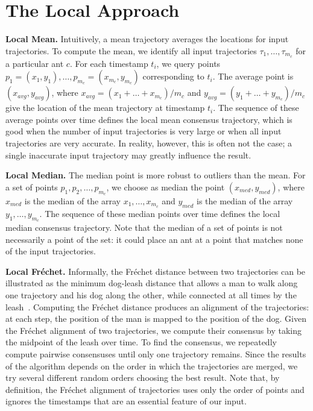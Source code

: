 \documentclass[runningheads]{llncs}
\newcommand{\Frechet}[0]{Fr\'{e}chet}
\begin{document}
\section{The Local Approach}
\label{sect:local}

{\bf Local Mean.}
Intuitively, a mean trajectory averages the locations for
input trajectories. To compute the mean, we identify all input
trajectories $\tau_1, \dots, \tau_{m_c}$ for a particular ant $c$. For
each timestamp $t_i$, we query points
$p_1=(x_1, y_1), \dots, p_{m_c}=(x_{m_c}, y_{m_c})$ corresponding to
$t_i$. The average point is $(x_{avg}, y_{avg})$,
where $x_{avg}=(x_1 + \dots + x_{m_c})/m_c$ and $y_{avg}=(y_1 + \dots
+ y_{m_c})/m_c$ give the location of the mean
trajectory at timestamp $t_i$. The sequence of these average points
over time defines the local mean consensus trajectory, which
 is good when the number of input trajectories is
very large or when all input trajectories are very accurate. In
reality, however, this is often not the case; a single
inaccurate input trajectory may greatly influence the result.

{\bf Local Median.}
The median point is more robust to outliers than the mean.
For a set of points $p_1,p_2, \dots, p_{m_c}$,
we choose as median
the point $(x_{med}, y_{med})$, where $x_{med}$ is the median of the
array $x_1, \dots, x_{m_c}$ and $y_{med}$ is
the median of the array $y_1, \dots, y_{m_c}$. The sequence of these
median points over time defines the local median consensus trajectory.
Note that the median of a set of points is not necessarily a point of
the set: it could place an ant at a point that matches none of the input trajectories.


{\bf Local \Frechet{}.}
Informally, the \Frechet{} distance between two trajectories can be illustrated as the
minimum dog-leash distance that allows a
man to walk along one trajectory and his dog along the other, while connected at all times by the leash~\cite{DBLP:journals/ijcga/AltG95}. Computing
the \Frechet{} distance produces an alignment of the trajectories:
at each step, the position of the man is mapped to the position of the
dog. Given the \Frechet{} alignment of two trajectories, we compute their
consensus by taking the midpoint of the leash over time.
To find the consensus, we repeatedly
compute pairwise consensuses until only one trajectory remains.
Since the results of the algorithm depends on the order in which the
trajectories are merged, we try several different random orders
choosing the best result. Note that, by definition, the
\Frechet{} alignment of trajectories uses only the order of points and
ignores the timestamps that are an essential feature of our input.
\end{document}
